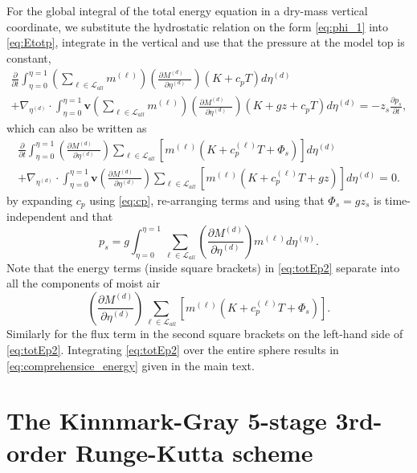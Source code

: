 \documentclass{agujournal}
\begin{document}
{For the global integral of the total energy equation in a dry-mass vertical coordinate, we substitute the hydrostatic relation on the form \eqref{eq:phi_1} into \eqref{eq:Etotp}, integrate in the vertical and use that the pressure at the model top is constant,
\begin{multline}
\frac{\partial }{\partial t}\int_{\eta=0}^{\eta=1} \left( \sum_{\ell \in \mathcal{L}_{all}} m^{(\ell)}\right) \left( \frac{\partial M^{(d)}\quad }{\partial \eta^{(d)}} \right)\left(K+c_pT\right)d \eta^{(d)}\\ +\nabla_{\eta^{(d)}} \cdot \int_{\eta=0}^{\eta=1} \mathbf{v} \left( \sum_{\ell \in \mathcal{L}_{all}} m^{(\ell)}\right) \left( \frac{\partial M^{(d)}\quad }{\partial \eta^{(d)}} \right)\left( K+gz+c_pT \right) d \eta^{(d)} =-z_s\frac{\partial p_s}{\partial t},\label{eq:tmp99}
\end{multline}
which can also be written as
\begin{multline}
\frac{\partial }{\partial t}\int_{\eta=0}^{\eta=1} \left( \frac{\partial M^{(d)}\quad }{\partial \eta^{(d)}} \right)\sum_{\ell \in \mathcal{L}_{all}} \left[m^{(\ell)} \left(K+c_p^{(\ell)}T+\Phi_s  \right)\right]d \eta^{(d)}\\ +\nabla_{\eta^{(d)}} \cdot \int_{\eta=0}^{\eta=1} \mathbf{v} \left( \frac{\partial M^{(d)}\quad }{\partial \eta^{(d)}} \right)\sum_{\ell \in \mathcal{L}_{all}} \left[ m^{(\ell)}\left(K+c_p^{(\ell)}T+gz\right) \right]d \eta^{(d)} =0.\label{eq:totEp2}
\end{multline}
by expanding $c_p$ using \eqref{eq:cp}, re-arranging terms and using that $\Phi_s=gz_s$ is time-independent and that 
\begin{equation}
p_s=g\int_{\eta=0}^{\eta=1}\sum_{\ell \in \mathcal{L}_{all}}  \left( \frac{\partial M^{(d)}}{\partial \eta^{(d)}}\right) m^{(\ell)}d\eta^{(\eta)}.
\end{equation}
Note that the energy terms (inside square brackets) in \eqref{eq:totEp2} separate into all the components of moist air
\begin{equation}
\left( \frac{\partial M^{(d)}}{\partial \eta^{(d)}} \right)\sum_{\ell \in \mathcal{L}_{all}} \left[ m^{(\ell)}\left(K+c_p^{(\ell)}T+\Phi_s\right)\right].
\end{equation}
Similarly for the flux term in the second square brackets on the left-hand side of \eqref{eq:totEp2}. Integrating \eqref{eq:totEp2} over the entire sphere results in \eqref{eq:comprehensice_energy} given in the main text.

\section{The Kinnmark-Gray 5-stage 3rd-order Runge-Kutta scheme}\label{app:KG53}

}
\end{document}
